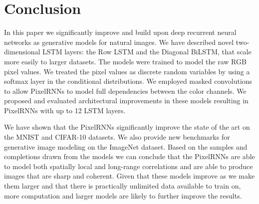 
\section{Conclusion}

In this paper we significantly improve and build upon deep recurrent neural networks as generative models for natural images. We have described novel two-dimensional LSTM layers: the Row LSTM and the Diagonal BiLSTM, that scale more easily to larger datasets. The models were trained to model the raw RGB pixel values. We treated the pixel values as discrete random variables by using a softmax layer in the conditional distributions. We employed masked convolutions to allow PixelRNNs to model full dependencies between the color channels. We proposed and evaluated architectural improvements in these models resulting in PixelRNNs with up to 12 LSTM layers.

We have shown that the PixelRNNs significantly improve the state of the art on the MNIST and CIFAR-10 datasets. We also provide new benchmarks for generative image modeling on the ImageNet dataset. Based on the samples and completions drawn from the models we can conclude that the PixelRNNs are able to model both spatially local and long-range correlations and are able to produce images that are sharp and coherent.
Given that these models improve as we make them larger and that there is practically unlimited data available to train on, more computation and larger models are likely to further improve the results.

